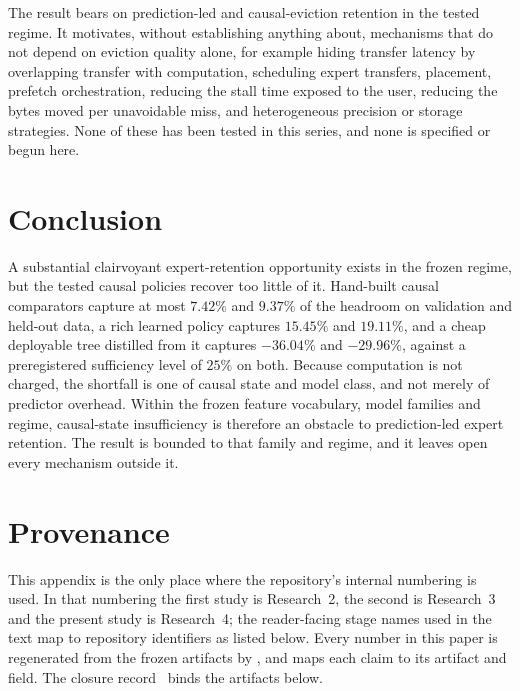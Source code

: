 \documentclass[11pt]{article}
\theoremstyle{plain}
\theoremstyle{definition}
\newcommand{\code}[1]{\texttt{\seqsplit{#1}}}
\begin{document}
The result bears on prediction-led and causal-eviction retention in the tested regime. It motivates, without establishing anything about, mechanisms that do not depend on eviction quality alone, for example hiding transfer latency by overlapping transfer with computation, scheduling expert transfers, placement, prefetch orchestration, reducing the stall time exposed to the user, reducing the bytes moved per unavoidable miss, and heterogeneous precision or storage strategies. None of these has been tested in this series, and none is specified or begun here.

\section{Conclusion}
\label{sec:conclusion}

A substantial clairvoyant expert-retention opportunity exists in the frozen regime, but the tested causal policies recover too little of it. Hand-built causal comparators capture at most $7.42\%$ and $9.37\%$ of the headroom on validation and held-out data, a rich learned policy captures $15.45\%$ and $19.11\%$, and a cheap deployable tree distilled from it captures $-36.04\%$ and $-29.96\%$, against a preregistered sufficiency level of $25\%$ on both. Because computation is not charged, the shortfall is one of causal state and model class, and not merely of predictor overhead. Within the frozen feature vocabulary, model families and regime, causal-state insufficiency is therefore an obstacle to prediction-led expert retention. The result is bounded to that family and regime, and it leaves open every mechanism outside it.




\appendix
\section{Provenance}
\label{app:prov}
This appendix is the only place where the repository's internal numbering is used. In that numbering the first study is Research~2, the second is Research~3 and the present study is Research~4; the reader-facing stage names used in the text map to repository identifiers as listed below. Every number in this paper is regenerated from the frozen artifacts by \code{paper/research4/scripts}, and \code{SOURCE\_MAP.md} maps each claim to its artifact and field. The closure record~\cite{argine4evidence} binds the artifacts below.
\end{document}
